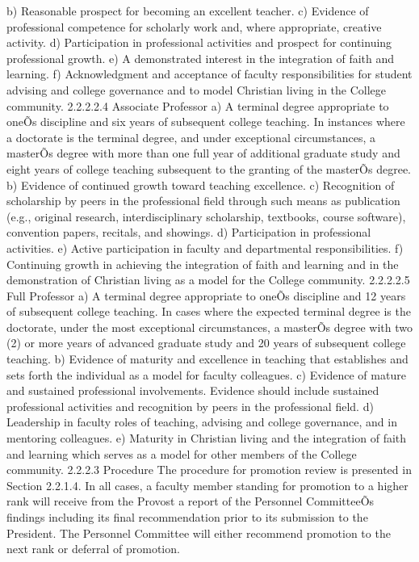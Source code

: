\documentclass[letterpaper, 11pt]{article}
\begin{document}
	b) Reasonable prospect for becoming an excellent teacher.
	c) Evidence of professional competence for scholarly work and, where appropriate, creative activity.
	d) Participation in professional activities and prospect for continuing professional growth.
	e) A demonstrated interest in the integration of faith and learning.
	f) Acknowledgment and acceptance of faculty responsibilities for student advising and college governance and to model Christian living in the College community.
	2.2.2.2.4 Associate Professor
	a) A terminal degree appropriate to oneÕs discipline and six years of subsequent college teaching. In instances where a doctorate is the terminal degree, and under exceptional circumstances, a masterÕs degree with more than one full year of additional graduate study and eight years of college teaching subsequent to the granting of the masterÕs degree.
	b) Evidence of continued growth toward teaching excellence.
	c) Recognition of scholarship by peers in the professional field through such means as publication (e.g., original research, interdisciplinary scholarship, textbooks, course software), convention papers, recitals, and showings.
	d) Participation in professional activities.
	e) Active participation in faculty and departmental responsibilities.
	f) Continuing growth in achieving the integration of faith and learning and in the demonstration of Christian living as a model for the College community.
	2.2.2.2.5 Full Professor
	a) A terminal degree appropriate to oneÕs discipline and 12 years of subsequent college teaching. In cases where the expected terminal degree is the doctorate, under the most exceptional circumstances, a masterÕs degree with two (2) or more years of advanced graduate study and 20 years of subsequent college teaching.
	b) Evidence of maturity and excellence in teaching that establishes and sets forth the individual as a model for faculty colleagues.
	c) Evidence of mature and sustained professional involvements. Evidence should include sustained professional activities and recognition by peers in the professional field.
	d) Leadership in faculty roles of teaching, advising and college governance, and in mentoring colleagues.
	e) Maturity in Christian living and the integration of faith and learning which serves as a model for other members of the College community.
	2.2.2.3 Procedure
	The procedure for promotion review is presented in Section 2.2.1.4.  In all cases, a faculty member standing for promotion to a higher rank will receive from the Provost a report of the Personnel CommitteeÕs findings including its final recommendation prior to its submission to the President.  The Personnel Committee will either recommend promotion to the next rank or deferral of promotion.
\end{document}
